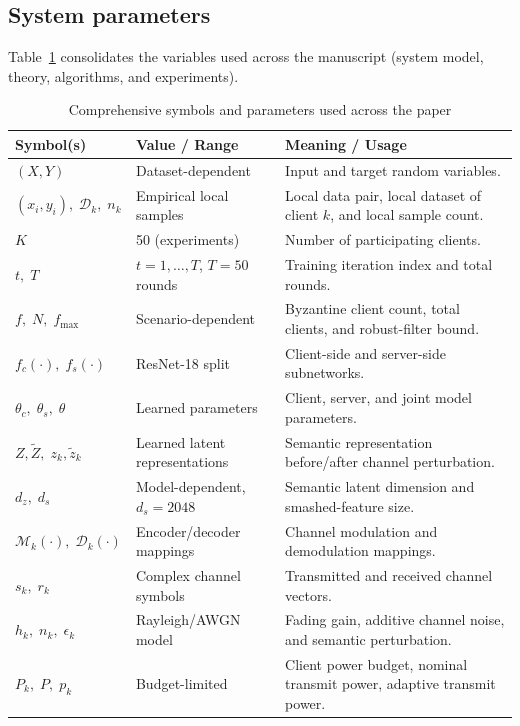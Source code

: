 \documentclass[10pt,journal]{IEEEtran}
\begin{document}
\subsection{System parameters}
Table~\ref{tab:parameters} consolidates the variables used across the manuscript (system model, theory, algorithms, and experiments).
\begin{table}[htbp]
\centering
\caption{Comprehensive symbols and parameters used across the paper}
\label{tab:parameters}
\footnotesize
\setlength{\tabcolsep}{4pt}
\begin{tabular}{p{}p{}p{}}
\toprule
\textbf{Symbol(s)} & \textbf{Value / Range} & \textbf{Meaning / Usage} \\
\midrule
$(X,Y)$ & Dataset-dependent & Input and target random variables. \\
$(x_i,y_i),\;\mathcal{D}_k,\;n_k$ & Empirical local samples & Local data pair, local dataset of client $k$, and local sample count. \\
$K$ & 50 (experiments) & Number of participating clients. \\
$t,\;T$ & $t=1,\ldots,T$, $T=50$ rounds & Training iteration index and total rounds. \\
$f,\;N,\;f_{\max}$ & Scenario-dependent & Byzantine client count, total clients, and robust-filter bound. \\
$f_c(\cdot),\;f_s(\cdot)$ & ResNet-18 split & Client-side and server-side subnetworks. \\
$\theta_c,\;\theta_s,\;\theta$ & Learned parameters & Client, server, and joint model parameters. \\
$Z,\tilde{Z},\;z_k,\tilde{z}_k$ & Learned latent representations & Semantic representation before/after channel perturbation. \\
$d_z,\;d_s$ & Model-dependent, $d_s=2048$ & Semantic latent dimension and smashed-feature size. \\
$\mathcal{M}_k(\cdot),\;\mathcal{D}_k(\cdot)$ & Encoder/decoder mappings & Channel modulation and demodulation mappings. \\
$s_k,\;r_k$ & Complex channel symbols & Transmitted and received channel vectors. \\
$h_k,\;n_k,\;\epsilon_k$ & Rayleigh/AWGN model & Fading gain, additive channel noise, and semantic perturbation. \\
$P_k,\;P,\;p_k$ & Budget-limited & Client power budget, nominal transmit power, adaptive transmit power. \\

\end{tabular}
\end{table}
\end{document}
